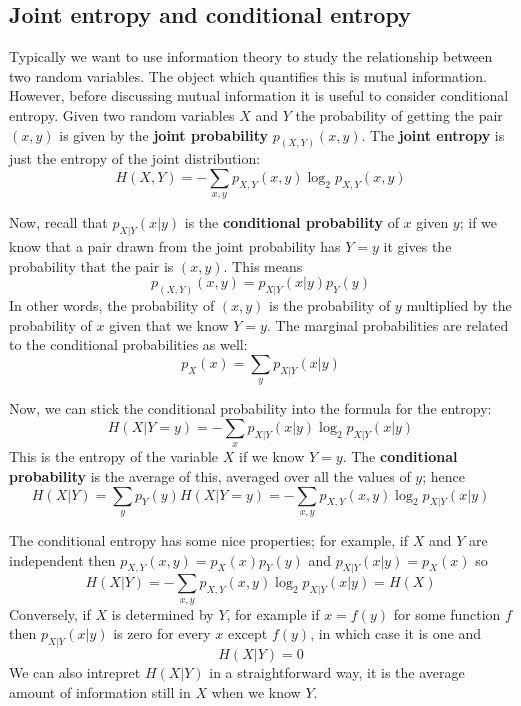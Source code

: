\documentclass[12pt]{article}
\begin{document}
\subsection*{Joint entropy and conditional entropy}

Typically we want to use information theory to study the relationship
between two random variables. The object which quantifies this is
mutual information. However, before discussing mutual information it
is useful to consider conditional entropy. Given two random variables
$X$ and $Y$ the probability of getting the pair $(x,y)$ is given by
the \textbf{joint probability} $p_{(X,Y)}(x,y)$. The \textbf{joint
  entropy} is just the entropy of the joint distribution:
\begin{equation}
H(X,Y)=-\sum_{x,y}p_{X,Y}(x,y)\log_2{p_{X,Y}(x,y)}
\end{equation}

Now, recall that
$p_{X|Y}(x|y)$ is the \textbf{conditional probability} of $x$ given $y$; if we
know that a pair drawn from the joint probability has $Y=y$ it gives
the probability that the pair is $(x,y)$. This means
\begin{equation}
p_{(X,Y)}(x,y)=p_{X|Y}(x|y)p_Y(y)
\end{equation}
In other words, the probability of $(x,y)$ is the probability of $y$
multiplied by the probability of $x$ given that we know $Y=y$. The
marginal probabilities are related to the conditional probabilities as
well:
\begin{equation}
p_X(x)=\sum_y p_{X|Y}(x|y)
\end{equation}

Now, we can stick the conditional probability into the formula for the entropy:
\begin{equation}
H(X|Y=y)=-\sum_{x} p_{X|Y}(x|y)\log_2{p_{X|Y}(x|y)}
\end{equation}
This is the entropy of the variable $X$ if we know $Y=y$. The \textbf{conditional probability} is the average of this, averaged over all the values of $y$; hence
\begin{equation}
H(X|Y)=\sum_y p_Y(y) H(X|Y=y)=-\sum_{x,y}p_{X,Y}(x,y)\log_2{p_{X|Y}(x|y)}
\end{equation}

The conditional entropy has some nice properties; for example, if $X$
and $Y$ are independent then $p_{X,Y}(x,y)=p_X(x)p_Y(y)$ and
$p_{X|Y}(x|y)=p_X(x)$ so
\begin{equation}
H(X|Y)=-\sum_{x,y}p_{X,Y}(x,y)\log_2{p_{X|Y}(x|y)}=H(X)
\end{equation}
Conversely, if $X$ is determined by $Y$, for example if $x=f(y)$ for
some function $f$ then $p_{X|Y}(x|y)$ is zero for every $x$ except
$f(y)$, in which case it is one and
\begin{equation}
H(X|Y)=0
\end{equation}
We can also intrepret $H(X|Y)$ in a straightforward way, it is the
average amount of information still in $X$ when we know $Y$.
\end{document}
